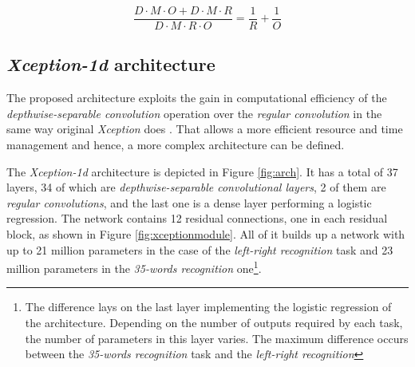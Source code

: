 $$ \frac{D \cdot M \cdot O  + D \cdot M \cdot R} {D \cdot M \cdot R \cdot O} = \frac{1}{R} + \frac{1}{O} $$



\subsection{\textit{Xception-1d} architecture}
The proposed architecture exploits the gain in computational efficiency of the \textit{depthwise-separable convolution} operation over the \textit{regular convolution} in the same way original \textit{Xception} does \autocite{chollet2017}. That allows a more efficient resource and time management and hence, a more complex architecture can be defined.

The \textit{Xception-1d} architecture is depicted in Figure \ref{fig:arch}. It has a total of 37 layers, 34 of which are \textit{depthwise-separable convolutional layers}, 2 of them are \textit{regular convolutions}, and the last one is a dense layer performing a logistic regression. The network contains 12 residual connections, one in each residual block, as shown in Figure \ref{fig:xceptionmodule}. All of it builds up a network with up to 21 million parameters in the case of the \textit{left-right recognition}  task and 23 million parameters in the \textit{35-words recognition} one\footnote{The difference lays on the last layer implementing the logistic regression of the architecture. Depending on the number of outputs required by each task, the number of parameters in this layer varies. The maximum difference occurs between the \textit{35-words recognition} task and the \textit{left-right recognition}}.

